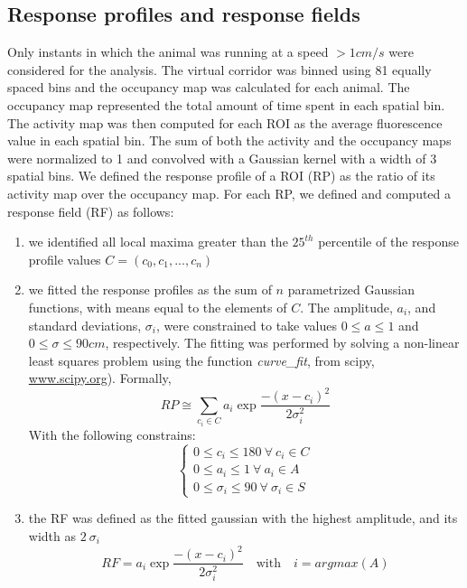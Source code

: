 \subsection{Response profiles and response fields}
\label{chap3:sec:7:subsec1:PF_and_response_profiles}
Only instants in which the animal was running at a speed $> 1 cm/s$ were considered for the analysis. 
The virtual corridor was binned using 81 equally spaced bins and the occupancy map was calculated for each animal. 
The occupancy map represented the total amount of time spent in each spatial bin. 
The activity map was then computed for each ROI as the average fluorescence value in each spatial bin. 
The sum of both the activity and the occupancy maps were normalized to 1 and convolved with a Gaussian kernel with a width of 3 spatial bins. 
We defined the response profile of a ROI (RP) as the ratio of its activity map over the occupancy map. 
For each RP, we defined and computed a response field (RF) as follows: 
\begin{enumerate}[label=\roman*)]
    \item we identified all local maxima greater than the $25^{th}$ percentile of the response profile values  $C = (c_0, c_1, ... , c_n)$
    \item we fitted the response profiles as the sum of $n$ parametrized Gaussian functions, with means equal to the elements of $C$.
    The amplitude, $a_i$, and standard deviations, $\sigma_i$, were constrained to take values $ 0 \leq a \leq 1 $ and $0 \leq \sigma \leq 90 cm$, respectively. 
    The fitting was performed by solving a non-linear least squares problem using the function \textit{curve\_fit}, from scipy, \url{www.scipy.org}).
    Formally,
    \begin{equation}
        RP \cong \sum_{c_i\in C} a_i\exp{\frac{-(x-c_i)^2}{2\sigma_i^2}}
    \end{equation}
    With the following constrains: 
    \begin{equation}
        \begin{cases}
            0\leq c_i \leq 180\ \forall\ c_i \in C \\
                0\leq a_i \leq 1\ \forall\ a_i \in A \\
                    0\leq \sigma_i \leq 90\ \forall\ \sigma_i \in S
        \end{cases}
    \end{equation}
    \item the RF was defined as the fitted gaussian with the highest amplitude, and its width as $2\ \sigma_i$
    \begin{equation}
        RF = a_i\exp{\frac{-(x-c_i)^2}{2\sigma_i^2}} \quad \text{with} \quad  i=argmax(A)
    \end{equation}
\end{enumerate}


